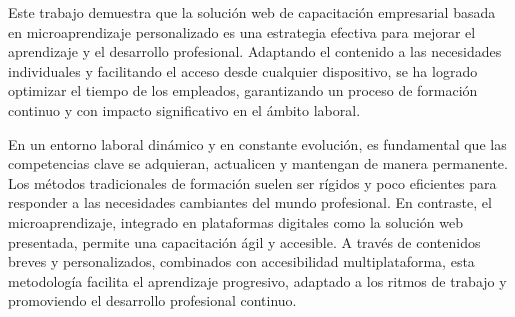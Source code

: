

Este trabajo demuestra que la solución web de capacitación empresarial basada en
microaprendizaje personalizado es una estrategia efectiva para mejorar el
aprendizaje y el desarrollo profesional. Adaptando el contenido a las
necesidades individuales y facilitando el acceso desde cualquier dispositivo, se
ha logrado optimizar el tiempo de los empleados, garantizando un proceso de
formación continuo y con impacto significativo en el ámbito laboral.

En un entorno laboral dinámico y en constante evolución, es fundamental que las
competencias clave se adquieran, actualicen y mantengan de manera permanente.
Los métodos tradicionales de formación suelen ser rígidos y poco eficientes para
responder a las necesidades cambiantes del mundo profesional. En contraste, el
microaprendizaje, integrado en plataformas digitales como la solución web
presentada, permite una capacitación ágil y accesible. A través de contenidos
breves y personalizados, combinados con accesibilidad multiplataforma, esta
metodología facilita el aprendizaje progresivo, adaptado a los ritmos de trabajo
y promoviendo el desarrollo profesional continuo.